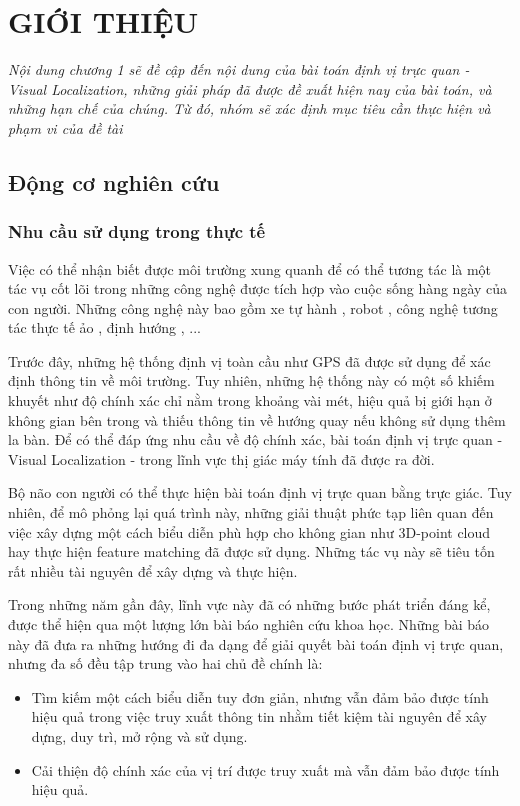 \chapter{GIỚI THIỆU}

\textit{Nội dung chương 1 sẽ đề cập đến nội dung của bài toán định vị trực quan - Visual Localization, những giải pháp đã được đề xuất hiện nay của bài toán, và những hạn chế của chúng. Từ đó, nhóm sẽ xác định mục tiêu cần thực hiện và phạm vi của đề tài}

\section{Động cơ nghiên cứu}

\subsection{Nhu cầu sử dụng trong thực tế}

Việc có thể nhận biết được môi trường xung quanh để có thể tương tác là một tác vụ cốt lõi trong những công nghệ được tích hợp vào cuộc sống hàng ngày của con người. Những công nghệ này bao gồm xe tự hành \cite{chaabane2021end}, robot \cite{sunderhauf2015place}, công nghệ tương tác thực tế ảo \cite{middelberg2014scalable}, định hướng \cite{sarlin2023orienternet}, ... 

Trước đây, những hệ thống định vị toàn cầu như GPS đã được sử dụng để xác định thông tin về môi trường. Tuy nhiên, những hệ thống này có một số khiếm khuyết như độ chính xác chỉ nằm trong khoảng vài mét, hiệu quả bị giới hạn ở không gian bên trong và thiếu thông tin về hướng quay nếu không sử dụng thêm la bàn. Để có thể đáp ứng nhu cầu về độ chính xác, bài toán định vị trực quan - Visual Localization - trong lĩnh vực thị giác máy tính đã được ra đời.

Bộ não con người có thể thực hiện bài toán định vị trực quan bằng trực giác. Tuy nhiên, để mô phỏng lại quá trình này, những giải thuật phức tạp liên quan đến việc xây dựng một cách biểu diễn phù hợp cho không gian như 3D-point cloud hay thực hiện feature matching đã được sử dụng. Những tác vụ này sẽ tiêu tốn rất nhiều tài nguyên để xây dựng và thực hiện.

Trong những năm gần đây, lĩnh vực này đã có những bước phát triển đáng kể, được thể hiện qua một lượng lớn bài báo nghiên cứu khoa học. Những bài báo này đã đưa ra những hướng đi đa dạng để giải quyết bài toán định vị trực quan, nhưng đa số đều tập trung vào hai chủ đề chính là:
\begin{itemize}
    \item Tìm kiếm một cách biểu diễn tuy đơn giản, nhưng vẫn đảm bảo được tính hiệu quả trong việc truy xuất thông tin nhằm tiết kiệm tài nguyên để xây dựng, duy trì, mở rộng và sử dụng.
    \item Cải thiện độ chính xác của vị trí được truy xuất mà vẫn đảm bảo được tính hiệu quả.
\end{itemize}

